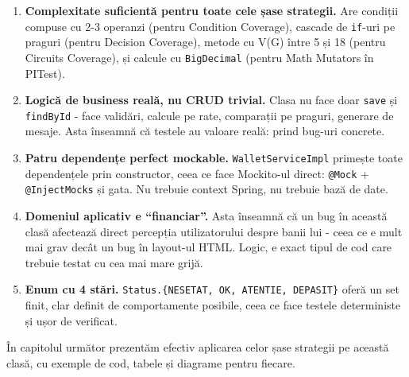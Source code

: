 \begin{enumerate}
    \item \textbf{Complexitate suficientă pentru toate cele șase strategii.} Are condiții compuse cu 2-3 operanzi (pentru Condition Coverage), cascade de \texttt{if}-uri pe praguri (pentru Decision Coverage), metode cu V(G) între 5 și 18 (pentru Circuits Coverage), și calcule cu \texttt{BigDecimal} (pentru Math Mutators în PITest).

    \item \textbf{Logică de business reală, nu CRUD trivial.} Clasa nu face doar \texttt{save} și \texttt{findById} - face validări, calcule pe rate, comparații pe praguri, generare de mesaje. Asta înseamnă că testele au valoare reală: prind bug-uri concrete.

    \item \textbf{Patru dependențe perfect mockable.} \texttt{WalletServiceImpl} primește toate dependențele prin constructor, ceea ce face Mockito-ul direct: \texttt{@Mock} + \texttt{@InjectMocks} și gata. Nu trebuie context Spring, nu trebuie bază de date.

    \item \textbf{Domeniul aplicativ e \enquote{financiar}.} Asta înseamnă că un bug în această clasă afectează direct percepția utilizatorului despre banii lui - ceea ce e mult mai grav decât un bug în layout-ul HTML. Logic, e exact tipul de cod care trebuie testat cu cea mai mare grijă.

    \item \textbf{Enum cu 4 stări.} \texttt{Status.\{NESETAT, OK, ATENTIE, DEPASIT\}} oferă un set finit, clar definit de comportamente posibile, ceea ce face testele deterministe și ușor de verificat.
\end{enumerate}

În capitolul următor prezentăm efectiv aplicarea celor șase strategii pe această clasă, cu exemple de cod, tabele și diagrame pentru fiecare.
